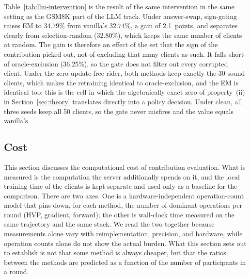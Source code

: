 \documentclass[letterpaper]{article} %
\theoremstyle{definition} %
\begin{document}
Table~\ref{tab:llm-intervention} is the result of the same intervention in
the same setting as the GSM8K part of the LLM track. Under answer-swap,
sign-gating raises EM to $34.79\%$ from vanilla's $32.74\%$, a gain of
2.1~points, and separates clearly from selection-random ($32.80\%$), which
keeps the same number of clients at random. The gain is therefore an effect
of the set that the sign of the contribution picked out, not of excluding
that many clients as such. It falls short of oracle-exclusion ($36.25\%$),
so the gate does not filter out every corrupted client. Under the zero-update
free-rider, both methods keep exactly the 30 sound clients, which makes the
retraining identical to oracle-exclusion, and the EM is identical too: this
is the cell in which the algebraically exact zero of property~(ii) in
Section~\ref{sec:theory} translates directly into a policy decision. Under
clean, all three seeds keep all 50 clients, so the gate never misfires and
the value equals vanilla's.

\subsection{Cost}
\label{sec:cost}

This section discusses the computational cost of contribution evaluation.
What is measured is the computation the server additionally spends on it, and
the local training time of the clients is kept separate and used only as a
baseline for the comparison. There are two axes. One is a
hardware-independent operation-count model that pins down, for each method,
the number of dominant operations per round (HVP, gradient, forward); the
other is wall-clock time measured on the same trajectory and the same stack.
We read the two together because measurements alone vary with
reimplementation, precision, and hardware, while operation counts alone do
not show the actual burden. What this section sets out to establish is not
that some method is always cheaper, but that the ratios between the methods
are predicted as a function of the number of participants in a round.
\end{document}
